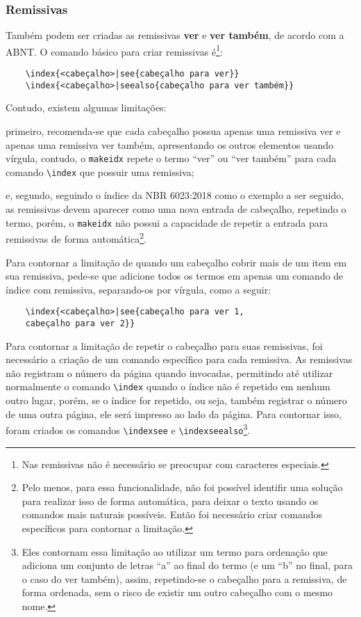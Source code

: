 \subsubsection{Remissivas}
    Também podem ser criadas as remissivas \textbf{ver} e \textbf{ver também}, de acordo com a ABNT. O comando básico para criar remissivas é\footnote{Nas remissivas não é necessário se preocupar com caracteres especiais.}:
\begin{verbatim}
    \index{<cabeçalho>|see{cabeçalho para ver}}
    \index{<cabeçalho>|seealso{cabeçalho para ver também}}
\end{verbatim}%
Contudo, existem algumas limitações: 
\begin{alinea}
    \item primeiro, recomenda-se que cada cabeçalho possua apenas uma remissiva ver e apenas uma remissiva ver também, apresentando os outros elementos usando vírgula, contudo, o \texttt{makeidx} repete o termo ``ver'' ou ``ver também'' para cada comando \verb|\index| que possuir uma remissiva; 
    \item e, segundo, seguindo o índice da NBR 6023:2018 como o exemplo a ser seguido, as remissivas devem aparecer como uma nova entrada de cabeçalho, repetindo o termo, porém, o \texttt{makeidx} não possui a capacidade de repetir a entrada para remissivas de forma automática\footnote{Pelo menos, para essa funcionalidade, não foi possível identifir uma solução para realizar isso de forma automática, para deixar o texto usando os comandos mais naturais possíveis. Então foi necessário criar comandos específicos para contornar a limitação.}.
\end{alinea}

    Para contornar a limitação de quando um cabeçalho cobrir mais de um item em sua remissiva, pede-se que adicione todos os termos em apenas um comando de índice com remissiva, separando-os por vírgula, como a seguir:
\begin{verbatim}
    \index{<cabeçalho>|see{cabeçalho para ver 1,
    cabeçalho para ver 2}}
\end{verbatim}%

    Para contornar a limitação de repetir o cabeçalho para suas remissivas, foi necessário a criação de um comando específico para cada remissiva. As remissivas não registram o número da página quando invocadas, permitindo até utilizar normalmente o comando \verb|\index| quando o índice não é repetido em nenhum outro lugar, porém, se o índice for repetido, ou seja, também registrar o número de uma outra página, ele será impresso ao lado da página. Para contornar isso, foram criados os comandos \verb|\indexsee| e \verb|\indexseealso|\footnote{Eles contornam essa limitação ao utilizar um termo para ordenação que adiciona um conjunto de letras ``a'' ao final do termo (e um ``b'' no final, para o caso do ver também), assim, repetindo-se o cabeçalho para a remissiva, de forma ordenada, sem o risco de existir um outro cabeçalho com o mesmo nome.}.

